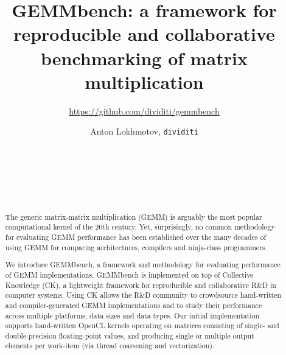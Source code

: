 \documentclass{acm_proc_article-sp} %
\begin{document}
\title{{GEMMbench}: a framework for reproducible and collaborative benchmarking
of matrix multiplication} 
%
\subtitle{\LARGE \url{https://github.com/dividiti/gemmbench}}


\author{
\alignauthor
  Anton Lokhmotov, {\Large \tt dividiti}\\
  \\
  \\
  \\
  \\
  \\
}

\maketitle

\begin{abstract}

The generic matrix-matrix multiplication (GEMM) is arguably the most popular
computational kernel of the 20th century. 
%
Yet, surprisingly, no common methodology for evaluating GEMM performance 
has been established over the many decades of using GEMM for comparing
architectures, compilers and ninja-class programmers.

We introduce GEMMbench, a framework and methodology for evaluating performance
of GEMM implementations.
%
GEMMbench is implemented on top of Collective Knowledge (CK), a lightweight
framework for reproducible and collaborative R\&D in computer systems.
%
Using CK allows the R\&D community to crowdsource hand-written and
compiler-generated GEMM implementations and to study their performance across
multiple platforms, data sizes and data types.
%
Our initial implementation supports hand-written OpenCL kernels operating on
matrices consisting of single- and double-precision floating-point values, and
producing single or multiple output elements per work-item (via thread
coarsening and vectorization).


\end{abstract}

\end{document}
